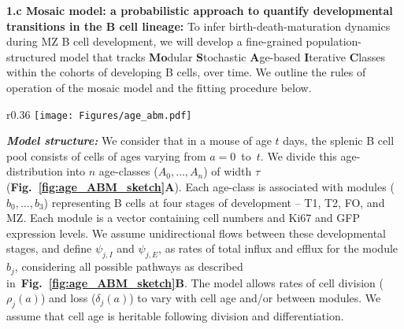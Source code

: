 \documentclass[11pt]{article}
\begin{document}
\textbf{{1.c Mosaic model: a probabilistic approach to quantify developmental transitions in the B cell lineage:}}
To infer birth-death-maturation dynamics during MZ B cell development, we will develop a fine-grained population-structured model that tracks \textbf{Mo}dular \textbf{S}tochastic \textbf{A}ge-based \textbf{I}terative \textbf{C}lasses within the cohorts of developing B cells, over time.
We outline the rules of operation of the mosaic model and the fitting procedure below.

\begin{wrapfigure}{r}{0.36\textwidth}
\centering
\texttt{[image: Figures/age\_abm.pdf]}
\vspace*{-6mm}
\caption{\textbf{Schematics of the Mosaic model.} A cell's age is defined as the time since its ancestor left the bone marrow (BM).} %
\vspace*{-6mm}
\label{fig:age_ABM_sketch}
\end{wrapfigure}

\textbf{\textit{Model structure:}}
We consider that in a mouse of age $t$ days, the splenic B cell pool consists of cells of ages varying from $a=0$~to~$t$.
We divide this age-distribution into $n$ age-classes ($A_{0} ,\ldots, A_{n}$)  of width $\tau$ (\textbf{Fig.~\ref{fig:age_ABM_sketch}A}).
Each age-class is associated with modules ($b_{0} ,\ldots, b_{3}$) representing B cells at four stages of development -- T1, T2, FO, and MZ. Each module is a vector containing cell numbers and Ki67 and GFP expression levels. %
We assume unidirectional flows between these developmental stages, and define $\psi_{j, I}$ and $\psi_{j, E}$, as rates of total influx and efflux for the module $b_j$, considering all possible pathways as described in~\textbf{Fig.~\ref{fig:age_ABM_sketch}B}.
The model allows rates of cell division ($\rho_{j}(a)$) and loss ($\delta_{j}(a)$) to vary with cell age and/or between modules. 
We assume that cell age is heritable following division and differentiation.
\end{document}
